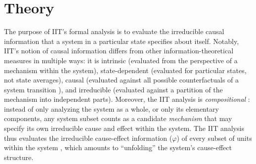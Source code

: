 \documentclass[preprints, article, accept, pdftex, moreauthors, letterpaper]{Definitions/mdpi}
\renewcommand{\=}[1]{\stackrel{#1}{=}} %
\renewcommand{\*}{\otimes}%
\begin{document}
\section{Theory}


The purpose of IIT's formal analysis is to evaluate the irreducible causal information that a system in a particular state specifies about itself. Notably, IIT's notion of causal information differs from other information-theoretical measures in multiple ways: it is intrinsic (evaluated from the perspective of a mechanism within the system), state-dependent (evaluated for particular states, not state averages), causal (evaluated against all possible counterfactuals of a system transition \cite{Pearl2000, Albantakis2019}), and irreducible (evaluated against a partition of the mechanism into independent parts). 
Moreover, the IIT analysis is \textit{compositional} \cite{Albantakis2019cc}: instead of only analyzing the system as a whole, or only its elementary components, any system subset counts as a candidate \textit{mechanism} that may specify its own irreducible cause and effect within the system. The IIT analysis thus evaluates the irreducible cause-effect information ($\varphi$) of every subset of units within the system \cite{Barbosa2021}, which amounts to ``unfolding'' the system's cause-effect structure.
\end{document}

